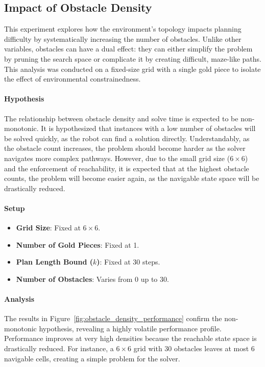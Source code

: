 \documentclass[12pt, a4paper, oneside]{report} %
\begin{document}
\subsection{Impact of Obstacle Density}
\label{sec:impact_obstacle_density}

This experiment explores how the environment's topology impacts planning difficulty by systematically increasing the number of obstacles. Unlike other variables, obstacles can have a dual effect: they can either simplify the problem by pruning the search space or complicate it by creating difficult, maze-like paths. This analysis was conducted on a fixed-size grid with a single gold piece to isolate the effect of environmental constrainedness.
\paragraph{Hypothesis} 
The relationship between obstacle density and solve time is expected to be non-monotonic. It is hypothesized that instances with a low number of obstacles will be solved quickly, as the robot can find a solution directly. Understandably, as the obstacle count increases, the problem should become harder as the solver navigates more complex pathways. However, due to the small grid size ($6 \times 6$) and the enforcement of reachability, it is expected that at the highest obstacle counts, the problem will become easier again, as the navigable state space will be drastically reduced.
\paragraph{Setup}
\begin{itemize}
    \item \textbf{Grid Size}: Fixed at $6 \times 6$.
    \item \textbf{Number of Gold Pieces}: Fixed at 1.
    \item \textbf{Plan Length Bound ($k$)}: Fixed at 30 steps.
    \item \textbf{Number of Obstacles}: Varies from 0 up to 30.

\end{itemize}

\paragraph{Analysis}
The results in Figure~\ref{fig:obstacle_density_performance} confirm the non-monotonic hypothesis, revealing a highly volatile performance profile. Performance improves at very high densities because the reachable state space is drastically reduced. For instance, a $6 \times 6$ grid with 30 obstacles leaves at most 6 navigable cells, creating a simple problem for the solver.
\end{document}
